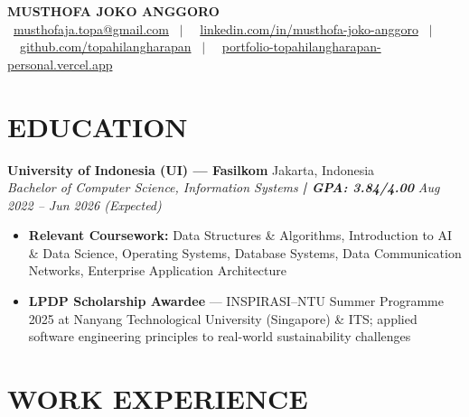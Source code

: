 \documentclass[10pt,a4paper]{article}
\newcommand{\contactline}[1]{\small #1}
\newcommand{\experienceheader}[4]{
    \textbf{#1} \hfill #2 \\
    \textit{#3} \hfill \textit{#4}
}
\begin{document}
\begin{center}
    {\LARGE \textbf{MUSTHOFA JOKO ANGGORO}} \\[2pt]
    \contactline{
        \faEnvelope\ \href{mailto:musthofaja.topa@gmail.com}{musthofaja.topa@gmail.com} \ $|$ \ 
        \faLinkedin\ \href{https://www.linkedin.com/in/musthofa-joko-anggoro/}{linkedin.com/in/musthofa-joko-anggoro} \ $|$ \
        \faGithub\ \href{https://github.com/topahilangharapan}{github.com/topahilangharapan} \ $|$ \
        \faGlobe\ \href{https://portfolio-topahilangharapan-personal.vercel.app/}{portfolio-topahilangharapan-personal.vercel.app}
    }
\end{center}

\vspace{-8pt}

\section*{EDUCATION}

\experienceheader{University of Indonesia (UI) — Fasilkom}{Jakarta, Indonesia}{Bachelor of Computer Science, Information Systems \textbf{| GPA: 3.84/4.00}}{Aug 2022 -- Jun 2026 (Expected)}
\begin{itemize}[leftmargin=*, itemsep=0.5pt, topsep=1pt]
    \item \textbf{Relevant Coursework:} Data Structures \& Algorithms, Introduction to AI \& Data Science, Operating Systems, Database Systems, Data Communication Networks, Enterprise Application Architecture
    \item \textbf{LPDP Scholarship Awardee} — INSPIRASI--NTU Summer Programme 2025 at Nanyang Technological University (Singapore) \& ITS; applied software engineering principles to real-world sustainability challenges
\end{itemize}

\vspace{-4pt}

\section*{WORK EXPERIENCE}
\end{document}
